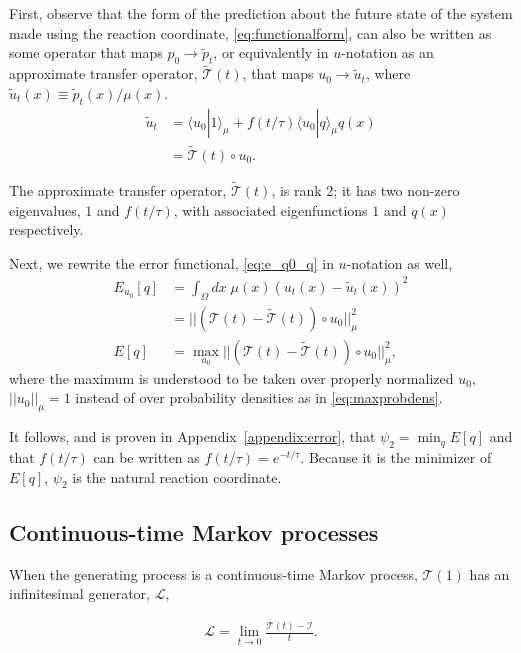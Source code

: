 \documentclass[aip, jcp, reprint, nolinenumbers, twocolumn, nobalancelastpage]{revtex4-1}
\begin{document}

First, observe that the form of the prediction about the future state of the system made using the reaction coordinate, \cref{eq:functionalform}, can also be written as some operator that maps $p_0 \rightarrow \tilde{p}_t$, or equivalently in $u$-notation as an approximate transfer operator, $\tilde{\mathcal{T}}(t)$, that maps $u_0 \rightarrow  \tilde{u}_t$, where $\tilde{u}_t(x) \equiv \tilde{p}_t(x)/\mu(x)$.
\begin{align}
    \tilde{u}_t &= \langle u_0 | 1 \rangle_\mu + f(t/\tau) \langle u_0 | q \rangle_\mu q(x) \label{eq:predict_u}\\
    &= \tilde{\mathcal{T}}(t) \circ u_0.
\end{align}

\noindent{}The approximate transfer operator, $\tilde{\mathcal{T}}(t)$, is rank 2; it has two non-zero eigenvalues, $1$ and $f(t/\tau)$, with associated eigenfunctions $1$ and $q(x)$ respectively.

Next, we rewrite the error functional, \cref{eq:e_q0_q} in $u$-notation as well,
\begin{align}
E_{u_0}[q] &=  \int_\Omega dx\; \mu(x) (u_t(x) - \tilde{u}_t(x))^2 \\
&= || (\mathcal{T}(t) - \tilde{\mathcal{T}}(t)) \circ u_0 ||_\mu^2 \\
\label{eq:error_functional}
E[q] &= \max_{u_0} || (\mathcal{T}(t) - \tilde{\mathcal{T}}(t)) \circ u_0 ||_\mu^2,
\end{align}
where the maximum is understood to be taken over properly normalized $u_0$, $||u_0||_\mu = 1$ instead of over probability densities as in \cref{eq:maxprobdens}. 

It follows, and is proven in Appendix~\ref{appendix:error}, that $\psi_2 = \min_q E[q]$ and that $f(t/\tau)$ can be written as $f(t/\tau) = e^{-t/\tau}$. Because it is the minimizer of $E[q]$, $\psi_2$ is the natural reaction coordinate.


\subsection{Continuous-time Markov processes}

When the generating process is a continuous-time Markov process, $\mathcal{T}(1)$ has an infinitesimal generator, $\mathcal{L}$,

\begin{align}
\mathcal{L} = \lim_{t\rightarrow 0} \frac{\mathcal{T}(t) - \mathcal{I}}{t}.
\end{align}
\end{document}
